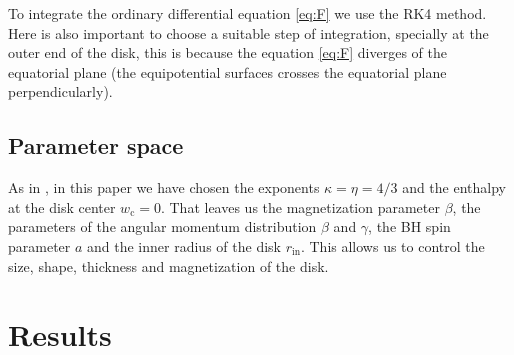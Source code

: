 \documentclass{aa}
\begin{document}
To integrate the ordinary differential equation \eqref{eq:F} we use the RK4 method. Here is also important to choose a suitable step of integration, specially at the outer end of the disk, this is because the equation \eqref{eq:F} diverges of the equatorial plane (the equipotential surfaces crosses the equatorial plane perpendicularly).

\subsection{Parameter space}

As in \citet{Komissarov:2006}, in this paper we have chosen the exponents $\kappa = \eta = 4/3$ and the enthalpy at the disk center $w_{\mathrm{c}} = 0$. That leaves us the magnetization parameter $\beta$, the parameters of the angular momentum distribution $\beta$ and $\gamma$, the BH spin parameter $a$ and the inner radius of the disk $r_{\mathrm{in}}$. This allows us to control the size, shape, thickness and magnetization of the disk.

\section{Results}
\end{document}
